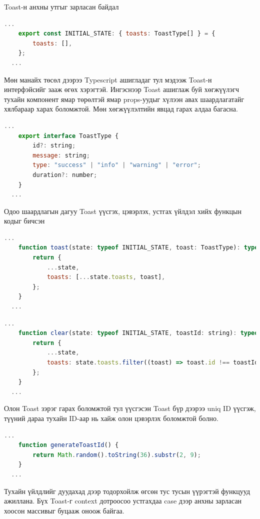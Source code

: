 Toast-н анхны утгыг зарласан байдал 

\begin{lstlisting}[language=Javascript, caption=Toast context-н анхны утгыг зарласан байдал, frame=single]
	...  
	export const INITIAL_STATE: { toasts: ToastType[] } = {
		toasts: [],
	};
  ...
\end{lstlisting}

Мөн манайх төсөл дээрээ Typescript ашигладаг тул мэдээж Toast-н интерфэйсийг зааж өгөх хэрэгтэй. Ингэснээр Toast ашиглаж буй хөгжүүлэгч тухайн компонент ямар төрөлтэй ямар props-уудыг хүлээн авах шаардлагатайг хялбараар харах боломжтой. Мөн хөгжүүлэлтийн явцад гарах алдаа багасна.

\begin{lstlisting}[language=Javascript, caption=Toast-н интерфэйс тодорхойлох, frame=single]
	...  
	export interface ToastType {
		id?: string;
		message: string;
		type: "success" | "info" | "warning" | "error";
		duration?: number;
	}
  ...
\end{lstlisting}

Одоо шаардлагын дагуу Toast үүсгэх, цэвэрлэх, устгах үйлдэл хийх функцын кодыг бичсэн

\begin{lstlisting}[language=Javascript, caption=Toast үүсгэх функц, frame=single]
	...  
	function toast(state: typeof INITIAL_STATE, toast: ToastType): typeof state {
		return {
			...state,
			toasts: [...state.toasts, toast],
		};
	}
  ...
\end{lstlisting}

\begin{lstlisting}[language=Javascript, caption=Toast-г context-оос цэвэрлэх, frame=single]
	...  
	function clear(state: typeof INITIAL_STATE, toastId: string): typeof state {
		return {
			...state,
			toasts: state.toasts.filter((toast) => toast.id !== toastId),
		};
	}
  ...
\end{lstlisting}

Олон Toast зэрэг гарах боломжтой тул үүсгэсэн Toast бүр дээрээ uniq ID үүсгэж, түүний дараа тухайн ID-аар нь хайж олон цэвэрлэх боломжтой болно. 

\begin{lstlisting}[language=Javascript, caption=Uniq ID гаргах, frame=single]
	...  
	function generateToastId() {
		return Math.random().toString(36).substr(2, 9);
	}
  ...
\end{lstlisting}

Тухайн үйлдлийг дуудахад дээр тодорхойлж өгсөн тус тусын үүрэгтэй функцууд ажиллана. Бүх Toast-г context дотроосоо устгахдаа case дээр анхны зарласан хоосон массивыг буцааж оноож байгаа. 

